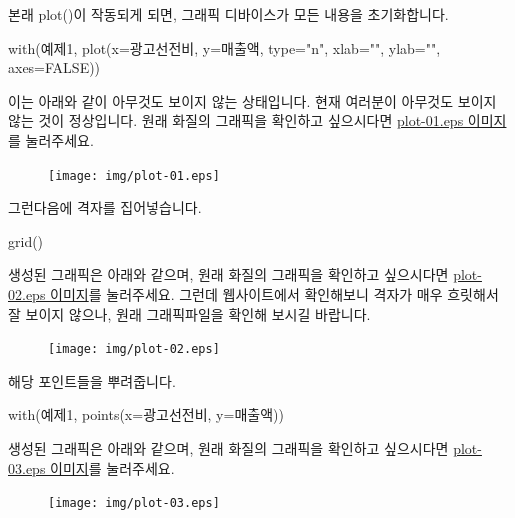 본래 plot()이 작동되게 되면, 그래픽 디바이스가 모든 내용을 초기화합니다. 
\begin{Schunk}
\begin{Soutput}	
with(예제1, plot(x=광고선전비, y=매출액, type="n", xlab="", ylab="", axes=FALSE))
\end{Soutput}
\end{Schunk}

이는 아래와 같이 아무것도 보이지 않는 상태입니다. 
현재 여러분이 아무것도 보이지 않는 것이 정상입니다. 
원래 화질의 그래픽을 확인하고 싶으시다면 \href{http://korea.gnu.org/gnustats/img/plot-01.eps}{plot-01.eps 이미지}를 눌러주세요. 

\begin{figure}
\begin{center}
\texttt{[image: img/plot-01.eps]}
\end{center}
\end{figure}
 
 
그런다음에 격자를 집어넣습니다. 
\begin{Schunk}
\begin{Soutput}	
grid()
\end{Soutput}
\end{Schunk}
생성된 그래픽은 아래와 같으며, 원래 화질의 그래픽을 확인하고 싶으시다면 \href{http://korea.gnu.org/gnustats/img/plot-02.eps}{plot-02.eps 이미지}를 눌러주세요.
그런데 웹사이트에서 확인해보니 격자가 매우 흐릿해서 잘 보이지 않으나, 원래 그래픽파일을 확인해 보시길 바랍니다.  

\begin{figure}
\begin{center}
\texttt{[image: img/plot-02.eps]}
\end{center}
\end{figure}


해당 포인트들을 뿌려줍니다.
\begin{Schunk}
\begin{Soutput}	
with(예제1, points(x=광고선전비, y=매출액))
\end{Soutput}
\end{Schunk}
생성된 그래픽은 아래와 같으며, 원래 화질의 그래픽을 확인하고 싶으시다면 \href{http://korea.gnu.org/gnustats/img/plot-03.eps}{plot-03.eps 이미지}를 눌러주세요. 

\begin{figure}
\begin{center}
\texttt{[image: img/plot-03.eps]}
\end{center}
\end{figure}

